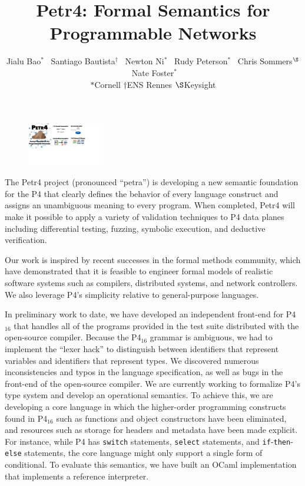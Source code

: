 \documentclass[10pt]{article}
\title{\bf Petr4: Formal Semantics for Programmable Networks}
\author{
Jialu Bao${}^*$~
Santiago Bautista${}^\dagger$~
Newton Ni${}^*$~
Rudy Peterson${}^*$~
Chris Sommers${}^\S$~
Nate Foster${}^*$~\\
$*$Cornell \quad $\dagger$ENS Rennes \quad $\S$Keysight
}
\newcommand{\petra}{Petr4\xspace}
\begin{document}
\maketitle

\begin{figure}
\vspace*{-1em}
\centerline{\includegraphics[width=0.3\textwidth]{logo}}
\end{figure}

The \petra project (pronounced ``petra'') is developing a new semantic
foundation for the P4 that clearly defines the behavior of every
language construct and assigns an unambiguous meaning to every
program. When completed, \petra will make it possible to apply a
variety of validation techniques to P4 data planes including
differential testing, fuzzing, symbolic execution, and deductive
verification.

Our work is inspired by recent successes in the formal methods
community, which have demonstrated that it is feasible to engineer
formal models of realistic software systems such as compilers,
distributed systems, and network controllers. We also leverage P4's
simplicity relative to general-purpose languages.

In preliminary work to date, we have developed an independent
front-end for P4$_{16}$ that handles all of the programs provided in
the test suite distributed with the open-source compiler. Because the
P4$_{16}$ grammar is ambiguous, we had to implement the ``lexer hack''
to distinguish between identifiers that represent variables and
identifiers that represent types. We discovered numerous
inconsistencies and typos in the language specification, as well as
bugs in the front-end of the open-source compiler. We are currently
working to formalize P4's type system and develop an
operational semantics. To achieve this, we are developing a core
language in which the higher-order programming constructs found in
P4$_{16}$ such as functions and object constructors have been
eliminated, and resources such as storage for headers and metadata
have been made explicit. For instance, while P4
has \texttt{switch} statements, \texttt{select} statements,
and \texttt{if}-\texttt{then}-\texttt{else} statements, the core
language might only support a single form of conditional.
To evaluate this semantics, we have built an OCaml implementation that
implements a reference interpreter.
\end{document}
